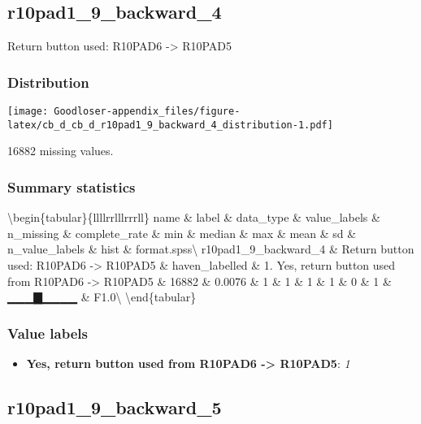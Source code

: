 \documentclass[
]{book}
\providecommand{\tightlist}{%
  \setlength{\itemsep}{0pt}\setlength{\parskip}{0pt}}
\begin{document}
\hypertarget{r10pad1_9_backward_4}{%
\subsection{r10pad1\_9\_backward\_4}\label{r10pad1_9_backward_4}}

Return button used: R10PAD6 -\textgreater{} R10PAD5

\hypertarget{r10pad1_9_backward_4_distribution}{%
\subsubsection{Distribution}\label{r10pad1_9_backward_4_distribution}}

\texttt{[image: Goodloser-appendix\_files/figure-latex/cb\_d\_cb\_d\_r10pad1\_9\_backward\_4\_distribution-1.pdf]}

16882 missing values.

\hypertarget{r10pad1_9_backward_4_summary}{%
\subsubsection{Summary statistics}\label{r10pad1_9_backward_4_summary}}

\textbackslash begin\{tabular\}\{l\textbar l\textbar l\textbar l\textbar r\textbar r\textbar l\textbar l\textbar l\textbar r\textbar r\textbar r\textbar l\textbar l\}
\hline
name \& label \& data\_type \& value\_labels \& n\_missing \& complete\_rate \& min \& median \& max \& mean \& sd \& n\_value\_labels \& hist \& format.spss\textbackslash{}
\hline
r10pad1\_9\_backward\_4 \& Return button used: R10PAD6 -\textgreater{} R10PAD5 \& haven\_labelled \& 1. Yes, return button used from R10PAD6 -\textgreater{} R10PAD5 \& 16882 \& 0.0076 \& 1 \& 1 \& 1 \& 1 \& 0 \& 1 \& ▁▁▁▇▁▁▁▁ \& F1.0\textbackslash{}
\hline
\textbackslash end\{tabular\}

\hypertarget{r10pad1_9_backward_4_labels}{%
\subsubsection{Value labels}\label{r10pad1_9_backward_4_labels}}

\begin{itemize}
\tightlist
\item
  \textbf{Yes, return button used from R10PAD6 -\textgreater{} R10PAD5}: \emph{1}
\end{itemize}

\hypertarget{r10pad1_9_backward_5}{%
\subsection{r10pad1\_9\_backward\_5}\label{r10pad1_9_backward_5}}
\end{document}
